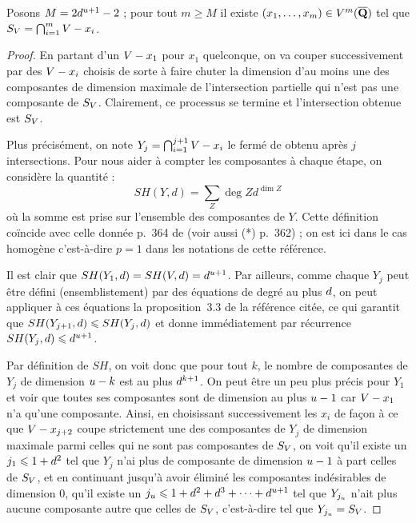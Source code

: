 \begin{lem}
  Posons \( M = 2 d^{u+1} - 2 \) ; pour tout \( m \ge M \) il existe
  \( (x_1, \dots, x_m) \in V^m(\overline{{\mathbf{Q}}}) \) tel que
  \( S_V = \bigcap_{i=1}^m V - x_i \).
\end{lem}

\begin{proof}
  En partant d'un \( V - x_1 \) pour \( x_1 \) quelconque, on va couper
  successivement par des \( V - x_i \) choisis de sorte à faire chuter la
  dimension d'au moins une des composantes de dimension maximale de
  l'intersection partielle qui n'est pas une composante de \( S_V \).
  Clairement, ce processus se termine et l'intersection obtenue est \( S_V
  \).

  Plus précisément, on note \( Y_j = \bigcap_{i=1}^{j+1} V - x_i \) le
  fermé de  obtenu après \( j \) intersections.  Pour nous aider
  à compter les composantes à chaque étape, on considère la quantité :
  \begin{equation}
    SH(Y, d)
    =
    \sum_Z \deg Z d^{\dim Z}
  \end{equation}
  où la somme est prise sur l'ensemble des composantes de \( Y \). Cette
  définition coïncide avec celle donnée p.~364 de \cite{philz} (voir aussi (*)
  p.~362) ; on est ici dans le cas homogène c'est-à-dire \( p = 1 \) dans les
  notations de cette référence.

  Il est clair que \( SH(Y_1, d) = SH(V, d) = d^{u+1} \).
  Par ailleurs, comme chaque \( Y_j \) peut être défini (ensemblistement) par
  des équations de degré au plus \( d \), on peut appliquer à ces
  équations la proposition~3.3 de la référence citée, ce qui garantit que \(
    SH(Y_{j+1}, d) \leqslant SH(Y_j, d) \) et donne immédiatement par
  récurrence \( SH(Y_j, d) \leqslant d^{u+1} \).

  Par définition de \( SH \), on voit donc que pour tout \( k \), le nombre de
  composantes de \( Y_j \) de dimension \( u - k \) est au plus \(
    d^{k+1} \).  On peut être un peu plus précis pour \( Y_1 \) et voir
  que toutes ses composantes sont de dimension au plus \( u - 1 \) car \(
    V - x_1 \) n'a qu'une composante. Ainsi, en choisissant successivement
  les \( x_i \) de façon à ce que \( V - x_{j+2} \) coupe strictement une
  des composantes de \( Y_j \) de dimension maximale parmi celles qui ne sont
  pas composantes de \( S_V \), on voit qu'il existe un \( j_1 \leqslant 1 +
    d^2 \) tel que \( Y_j \) n'ai plus de composante de dimension \( u
    - 1 \) à part celles de \( S_V \), et en continuant jusqu'à avoir
  éliminé les composantes indésirables de dimension \( 0 \), qu'il existe un
  \( j_u \leqslant 1 + d^2 + d^3 + \dots + d^{u+1} \) tel que \(
    Y_{j_u} \) n'ait plus aucune composante autre que celles de \( S_V
  \), c'est-à-dire tel que \( Y_{j_u} = S_V \).


\end{proof}

